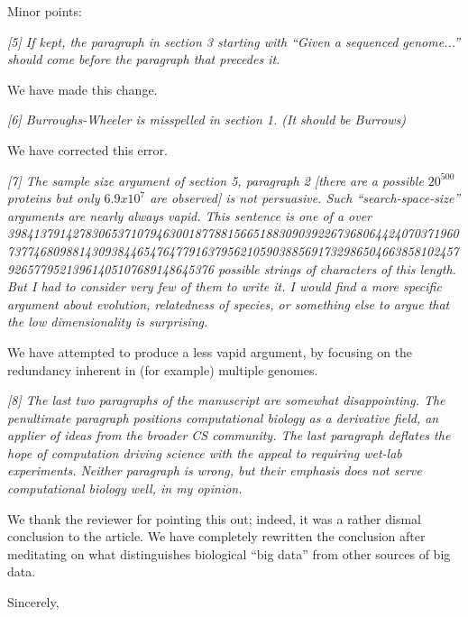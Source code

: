 \documentclass[12pt]{letter}
\begin{document}
\begin{letter}{}
Minor points:

\emph{[5] If kept, the paragraph in section 3 starting with ``Given a sequenced
genome...'' should come before the paragraph that precedes it.}

We have made this change.

\emph{[6] Burroughs-Wheeler is misspelled in section 1. (It should be Burrows)}

We have corrected this error.

\emph{[7] The sample size argument of section 5, paragraph 2 [there are a possible
$20^500$ proteins but only $6.9 x 10^7$ are observed] is not persuasive. Such
``search-space-size'' arguments are nearly always vapid.  This sentence is one of
a over
3984137914278306537107946300187788156651883090392267368064424070371960737746809881430938446547647791637956210590388569173298650466385810245792657795213961405107689148645376
possible strings of characters of this length. But I had to consider very few
of them to write it. I would find a more specific argument about evolution,
relatedness of species, or something else to argue that the low dimensionality
is surprising.}

We have attempted to produce a less vapid argument, by focusing on the redundancy inherent in (for example) multiple genomes.

\emph{[8] The last two paragraphs of the manuscript are somewhat disappointing. The
penultimate paragraph positions computational biology as a derivative field, an
applier of ideas from the broader CS community. The last paragraph deflates the
hope of computation driving science with the appeal to requiring wet-lab
experiments.  Neither paragraph is wrong, but their emphasis does not serve
computational biology well, in my opinion. }

We thank the reviewer for pointing this out; indeed, it was a rather dismal conclusion to the article. We have completely rewritten the conclusion after meditating on what distinguishes biological ``big data'' from other sources of big data.

\closing{\hspace*{.5in}Sincerely,}
\end{letter} 
\end{document}
